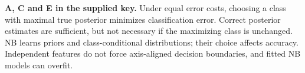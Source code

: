 \textbf{A, C and E in the supplied key.} Under equal error costs, choosing a class with maximal true posterior minimizes classification error. Correct posterior estimates are sufficient, but not necessary if the maximizing class is unchanged. NB learns priors and class-conditional distributions; their choice affects accuracy. Independent features do not force axis-aligned decision boundaries, and fitted NB models can overfit.
